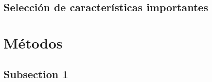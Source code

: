 \newpage
\subsection{Selección de características importantes}





\newpage

\section{Métodos}




\subsection{Subsection 1}
